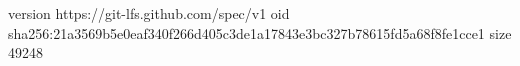 version https://git-lfs.github.com/spec/v1
oid sha256:21a3569b5e0eaf340f266d405c3de1a17843e3bc327b78615fd5a68f8fe1cce1
size 49248
